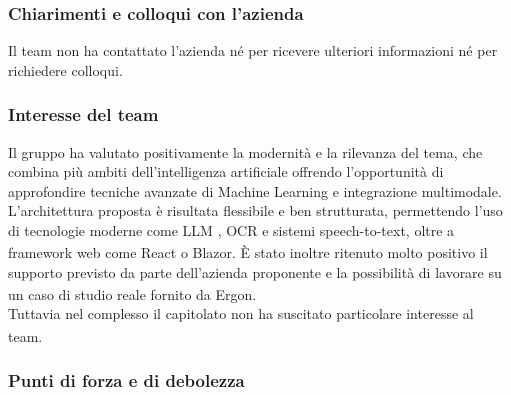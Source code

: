 \documentclass[a4paper,11pt]{article}
\begin{document}
\subsubsection{Chiarimenti e colloqui con l'azienda}
Il team non ha contattato l'azienda né per ricevere ulteriori informazioni né per richiedere colloqui.

\subsubsection{Interesse del team}
\parbox[t]{\linewidth}{%
Il gruppo ha valutato positivamente la modernità e la rilevanza del tema, che
combina più ambiti dell'intelligenza artificiale offrendo l'opportunità di
approfondire tecniche avanzate di Machine Learning e integrazione multimodale.
L'architettura proposta è risultata flessibile e ben strutturata, permettendo l'uso di
tecnologie moderne come LLM\textsubscript{}
, OCR\textsubscript{}
 e sistemi speech-to-text, oltre a framework
web come React o Blazor. È stato inoltre ritenuto molto positivo il supporto
previsto da parte dell'azienda proponente\textsubscript{}
 e la possibilità di lavorare su un caso di
studio reale fornito da Ergon.\\
Tuttavia nel complesso il capitolato\textsubscript{}
 non ha suscitato particolare interesse al team.
}
\newpage
\subsubsection{Punti di forza e di debolezza}
\end{document}
